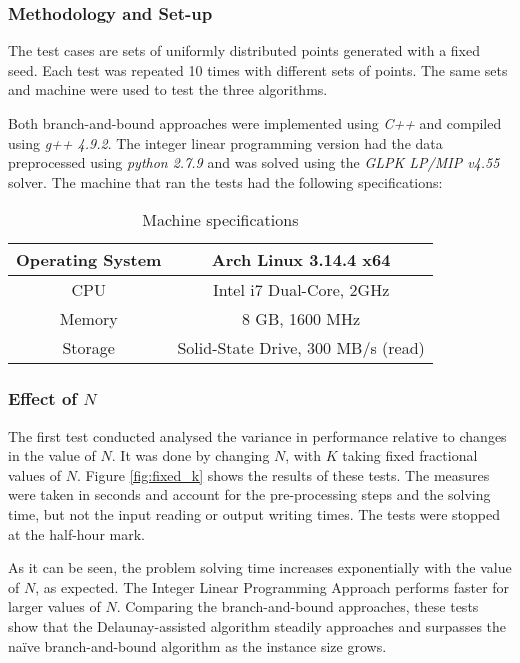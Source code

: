 \subsubsection*{Methodology and Set-up}
The test cases are sets of uniformly distributed points generated with a fixed seed. Each test was repeated 10 times with different sets of points. The same sets and machine were used to test the three algorithms.

Both branch-and-bound approaches were implemented using \emph{C++} and compiled using \emph{g++ 4.9.2}. The integer linear programming version had the data preprocessed using \emph{python 2.7.9} and was solved using the \emph{GLPK LP/MIP v4.55} solver. The machine that ran the tests had the following specifications:

\begin{table}[H]
	\begin{center}
		\begin{tabular}{|c|c|}
			\hline
			Operating System  & Arch Linux 3.14.4 x64\\\hline
			CPU & Intel i7 Dual-Core, 2GHz\\\hline
			Memory & 8 GB, 1600 MHz \\\hline
			Storage &  Solid-State Drive, 300 MB/s (read)\\\hline
		\end{tabular}
		\caption{Machine specifications}
	\end{center}
\end{table}

\subsubsection*{Effect of $N$}

The first test conducted analysed the variance in performance relative to changes in the value of $N$. It was done by changing $N$, with $K$ taking fixed fractional values of $N$. Figure \ref{fig:fixed_k} shows the results of these tests. The measures were taken in seconds and account for the pre-processing steps and the solving time, but not the input reading or output writing times. The tests were stopped at the half-hour mark. 

\noindent
As it can be seen, the problem solving time increases exponentially with the value of $N$, as expected.
The Integer Linear Programming Approach performs faster for larger values of $N$. Comparing the branch-and-bound approaches, these tests show that the Delaunay-assisted algorithm steadily approaches and surpasses the naïve branch-and-bound algorithm as the instance size grows.
